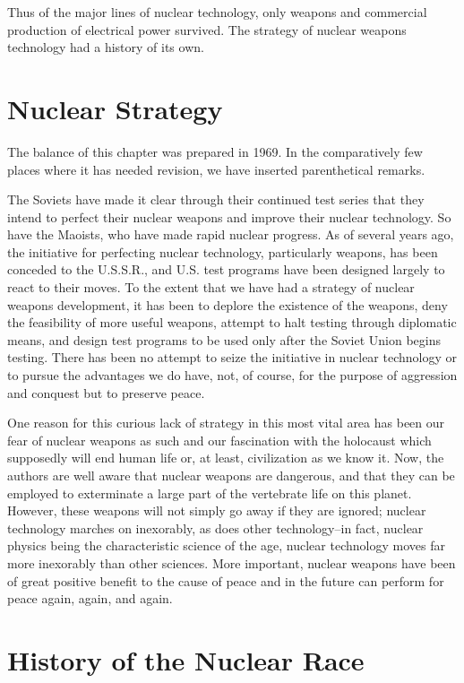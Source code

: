 Thus of the major lines of nuclear technology, only weapons and commercial production of electrical power survived. The strategy of nuclear weapons technology had a history of its own.

\section{Nuclear Strategy}
\begin{mdframed}[backgroundcolor=black!10]
The balance of this chapter was prepared in 1969. In the comparatively few places where it has needed revision, we have inserted parenthetical remarks.
\end{mdframed}
The Soviets have made it clear through their continued test series that they intend to perfect their nuclear weapons and improve their nuclear technology. So have the Maoists, who have made rapid nuclear progress. As of several years ago, the initiative for perfecting nuclear technology, particularly weapons, has been conceded to the U.S.S.R., and U.S. test programs have been designed largely to react to their moves. To the extent that we have had a strategy of nuclear weapons development, it has been to deplore the existence of the weapons, deny the feasibility of more useful weapons, attempt to halt testing through diplomatic means, and design test programs to be used only after the Soviet Union begins testing. There has been no attempt to seize the initiative in nuclear technology or to pursue the advantages we do have, not, of course, for the purpose of aggression and conquest but to preserve peace.

One reason for this curious lack of strategy in this most vital area has been our fear of nuclear weapons as such and our fascination with the holocaust which supposedly will end human life or, at least, civilization as we know it. Now, the authors are well aware that nuclear weapons are dangerous, and that they can be employed to exterminate a large part of the vertebrate life on this planet. However, these weapons will not simply go away if they are ignored; nuclear technology marches on inexorably, as does other technology--in fact, nuclear physics being the characteristic science of the age, nuclear technology moves far more inexorably than other sciences. More important, nuclear weapons have been of great positive benefit to the cause of peace and in the future can perform for peace again, again, and again.

\section{History of the Nuclear Race}
